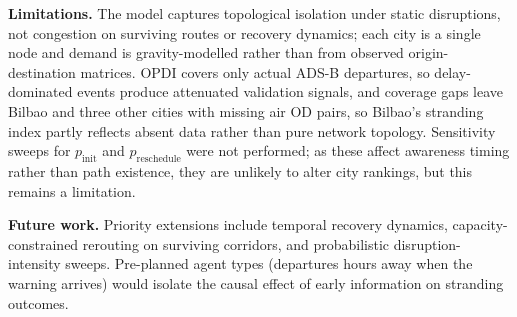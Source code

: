\documentclass[12pt,a4paper]{article}
\begin{document}
\textbf{Limitations.}
The model captures topological isolation under static disruptions, not congestion on surviving routes or recovery dynamics; each city is a single node and demand is gravity-modelled rather than from observed origin-destination matrices.
OPDI covers only actual ADS-B departures, so delay-dominated events produce attenuated validation signals, and coverage gaps leave Bilbao and three other cities with missing air OD pairs, so Bilbao's stranding index partly reflects absent data rather than pure network topology.
Sensitivity sweeps for $p_{\text{init}}$ and $p_{\text{reschedule}}$ were not performed; as these affect awareness timing rather than path existence, they are unlikely to alter city rankings, but this remains a limitation.

\textbf{Future work.}
Priority extensions include temporal recovery dynamics, capacity-constrained rerouting on
surviving corridors, and probabilistic disruption-intensity sweeps.
Pre-planned agent types (departures hours away when the warning arrives) would isolate the causal effect of early information on stranding outcomes.

\end{document}
